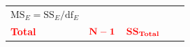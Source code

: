 \documentclass[]{book}
\theoremstyle{definition}
\theoremstyle{definition}
\theoremstyle{remark}
\begin{document}
\begin{longtable}[]{@{}lllll@{}}
\begin{minipage}[t]{0.21\columnwidth}
\(\text{MS}_E=\text{SS}_E/\text{df}_E\)\strut
\end{minipage} & \begin{minipage}[t]{0.12\columnwidth}\raggedright\strut
\strut
\end{minipage}\tabularnewline
\begin{minipage}[t]{0.16\columnwidth}\raggedright\strut
\textcolor{red}{\textbf{Total}}\strut
\end{minipage} & \begin{minipage}[t]{0.17\columnwidth}\raggedright\strut
\(\color{red}{\mathbf{N-1}}\)\strut
\end{minipage} & \begin{minipage}[t]{0.19\columnwidth}\raggedright\strut
\(\color{red}{\textbf{SS}_{\textbf{Total}}}\)\strut
\end{minipage} & \begin{minipage}[t]{0.21\columnwidth}\raggedright\strut
\strut
\end{minipage} & \begin{minipage}[t]{0.12\columnwidth}\raggedright\strut
\strut
\end{minipage}\tabularnewline
\bottomrule
\end{longtable}
\end{document}
